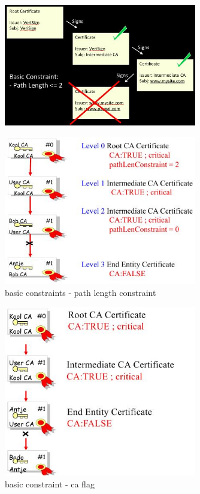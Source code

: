 \documentclass[ngerman,a4paper,12pt]{scrreprt}
\begin{document}
\begin{figure}[H]
	\centering
	\includegraphics[width=0.75\textwidth]{img/V7.9.jpg}
	\caption{}
	\label{}
\end{figure}
\begin{figure}[H]
	\centering
	\includegraphics[width=0.75\textwidth]{img/V7.10.jpg}
	\caption{basic constraints - path length constraint}
	\label{}
\end{figure}
\begin{figure}[H]
	\centering
	\includegraphics[width=0.75\textwidth]{img/V7.11.jpg}
	\caption{basic constraint - ca flag}
	\label{}
\end{figure}
\end{document}
